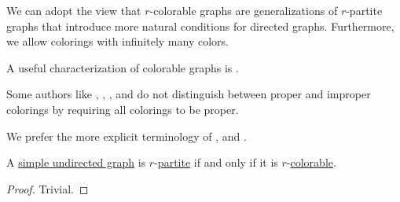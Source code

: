 \begin{comments}
  \item We can adopt the view that \( r \)-colorable graphs are generalizations of \( r \)-partite graphs that introduce more natural conditions for directed graphs. Furthermore, we allow colorings with infinitely many colors.

  \item A useful characterization of colorable graphs is .

  \item Some authors like , , ,  and  do not distinguish between proper and improper colorings by requiring all colorings to be proper.

  We prefer the more explicit terminology of ,  and .
\end{comments}

\begin{proposition}\label{thm:k_colorable_iff_multipartite}
  A \hyperref[def:undirected_graph]{simple undirected graph} is \( r \)-\hyperref[def:multipartite_graph]{partite} if and only if it is \( r \)-\hyperref[def:graph_coloring/colorable]{colorable}.
\end{proposition}
\begin{proof}
  Trivial.
\end{proof}

